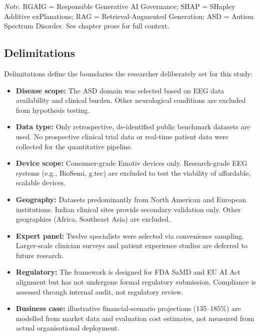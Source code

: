 \vspace{0.3em}\noindent\textit{Note.} RGAIG = Responsible Generative AI Governance; SHAP = SHapley Additive exPlanations; RAG = Retrieval-Augmented Generation; ASD = Autism Spectrum Disorder. See chapter prose for full context.

\subsection{Delimitations}
\label{sec:delimitations}

Delimitations define the boundaries the researcher deliberately set for this study:

\begin{itemize}[leftmargin=*, itemsep=3pt]
    \item \textbf{Disease scope:} The ASD domain was selected based on EEG data availability and clinical burden. Other neurological conditions are excluded from hypothesis testing.
    \item \textbf{Data type:} Only retrospective, de-identified public benchmark datasets are used. No prospective clinical trial data or real-time patient data were collected for the quantitative pipeline.
    \item \textbf{Device scope:} Consumer-grade Emotiv devices only. Research-grade EEG systems (e.g., BioSemi, g.tec) are excluded to test the viability of affordable, scalable devices.
    \item \textbf{Geography:} Datasets predominantly from North American and European institutions. Indian clinical sites provide secondary validation only. Other geographies (Africa, Southeast Asia) are excluded.
    \item \textbf{Expert panel:} Twelve specialists were selected via convenience sampling. Larger-scale clinician surveys and patient experience studies are deferred to future research.
    \item \textbf{Regulatory:} The framework is designed for FDA SaMD and EU AI Act alignment but has not undergone formal regulatory submission. Compliance is assessed through internal audit, not regulatory review.
    \item \textbf{Business case:} illustrative financial-scenario projections (135--185\%) are modelled from market data and evaluation cost estimates, not measured from actual organisational deployment.
\end{itemize}

